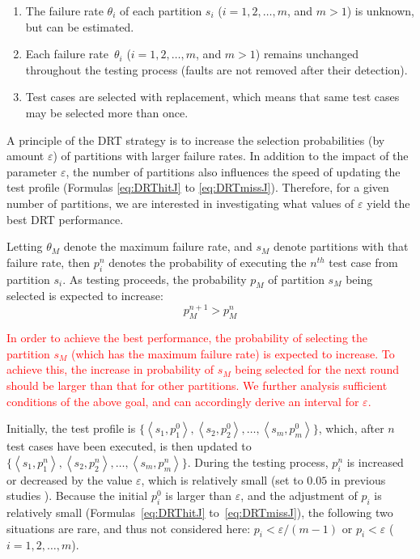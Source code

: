 \documentclass[10pt,journal,compsoc]{IEEEtran}
\begin{document}
\begin{enumerate}[1)]
  \item
  The failure rate $\theta_i$ of each partition $s_i$ ($i = 1, 2, \ldots, m$, and $m > 1$) is unknown, but can be estimated.

  \item
  Each failure rate~$\theta_i$ ($i = 1, 2, \ldots, m$, and $m > 1$) remains unchanged throughout the testing process (faults are not removed after their detection).

  \item
  Test cases are selected with replacement, which means that same test cases may be selected more than once.
\end{enumerate}

A principle of the DRT strategy is to increase the selection probabilities (by amount $\varepsilon$) of partitions with larger failure rates.
In addition to the impact of the parameter $\varepsilon$, the number of partitions also influences the speed of updating the test profile (Formulas \ref{eq:DRThitJ} to \ref{eq:DRTmissJ}).
Therefore, for a given number of partitions, we are interested in investigating what values of $\varepsilon$ yield the best DRT performance.

Letting $\theta_M$ denote the maximum failure rate, and $s_M$ denote partitions with that failure rate, then $p_i^n$ denotes the probability of executing the $n^{th}$ test case from partition $s_i$.
As testing proceeds, the probability $p_M$ of partition $s_M$ being selected is expected to increase:
\begin{equation}
    \label{eq:exception}
    p_M^{n + 1} > p_M^{n}
\end{equation}

\textcolor{red}{In order to achieve the best performance, the probability of selecting the partition $s_M$ (which has the maximum failure rate) is expected to increase. To achieve this, the increase in probability of $s_M$ being selected for the next round should be larger than that for other partitions. We further analysis sufficient conditions of the above goal, and can accordingly derive an interval for $\varepsilon$.}

Initially, the test profile is
$\{ \left \langle s_1,p_1^0 \right \rangle, \left \langle s_2,p_2^0 \right \rangle, \ldots, \left \langle s_m,p_m^0 \right \rangle\}$,
which, after $n$ test cases have been executed,  is then updated to
$\{ \left \langle s_1,p_1^n \right \rangle, \left \langle s_2,p_2^n \right \rangle, \ldots, \left \langle s_m,p_m^n \right \rangle\}$.
During the testing process, $p_i^n$ is increased or decreased by the value $\varepsilon$, which is relatively small (set to $0.05$ in previous studies \cite{Lv2011,li2015}).
Because the initial $p_i^0$ is larger than $\varepsilon$, and the adjustment of $p_i$ is relatively small (Formulas~\ref{eq:DRThitJ} to~\ref{eq:DRTmissJ}), the following two situations are rare, and thus not considered here:
$p_i < \varepsilon / (m - 1)$ or
$p_i < \varepsilon$ ($i = 1, 2, \ldots, m$).
\end{document}
